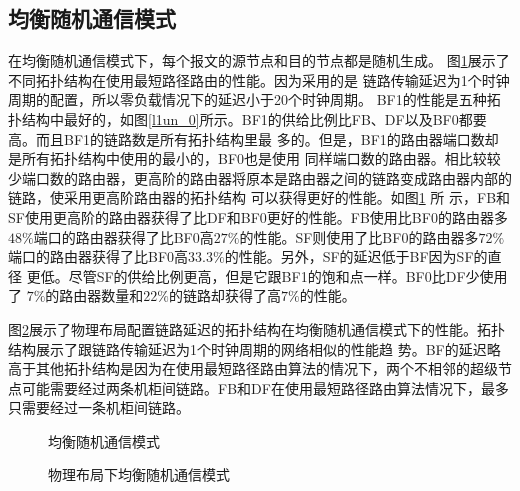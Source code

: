 \subsection{均衡随机通信模式}

在均衡随机通信模式下，每个报文的源节点和目的节点都是随机生成。
图\ref{l1un}展示了不同拓扑结构在使用最短路径路由的性能。因为采用的是
链路传输延迟为1个时钟周期的配置，所以零负载情况下的延迟小于20个时钟周期。
BF1的性能是五种拓扑结构中最好的，如图\ref{l1un_0}所示。BF1的供给比例比FB、DF以及BF0都要高。而且BF1的链路数是所有拓扑结构里最
多的。但是，BF1的路由器端口数却是所有拓扑结构中使用的最小的，BF0也是使用
同样端口数的路由器。相比较较少端口数的路由器，更高阶的路由器将原本是路由器之间的链路变成路由器内部的链路，使采用更高阶路由器的拓扑结构
可以获得更好的性能。如图\ref{l1un} 所
示，FB和SF使用更高阶的路由器获得了比DF和BF0更好的性能。FB使用比BF0的路由器多$48\%$端口的路由器获得了比BF0高$27\%$的性能。SF则使用了比BF0的路由器多$72\%$端口的路由器获得了比BF0高$33.3\%$的性能。另外，SF的延迟低于BF因为SF的直径
更低。尽管SF的供给比例更高，但是它跟BF1的饱和点一样。BF0比DF少使用了
$7\%$的路由器数量和$22\%$的链路却获得了高$7\%$的性能。

图\ref{layoutun}展示了物理布局配置链路延迟的拓扑结构在均衡随机通信模式下的性能。拓扑结构展示了跟链路传输延迟为1个时钟周期的网络相似的性能趋
势。BF的延迟略高于其他拓扑结构是因为在使用最短路径路由算法的情况下，两个不相邻的超级节点可能需要经过两条机柜间链路。FB和DF在使用最短路径路由算法情况下，最多只需要经过一条机柜间链路。


\begin{figure}[t]
  \centering
 \begin{minipage}[t]{\textwidth}
   \centering
  \vspace{-.3cm}
  \caption{均衡随机通信模式}
  \label{l1un}
  \end{minipage}
\end{figure}

\begin{figure}[t]
\setlength{\belowcaptionskip}{-.3cm}%
  \centering
 \begin{minipage}[t]{\textwidth}
   \centering
  \vspace{-.3cm}
  \caption{物理布局下均衡随机通信模式}
  \label{layoutun}
  \end{minipage}
  \end{figure}

